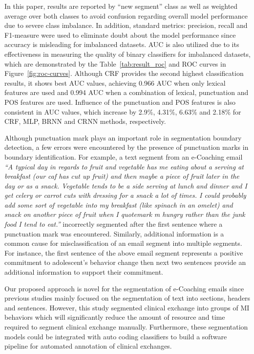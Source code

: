 \documentclass{amia}
\begin{document}
In this paper, results are reported by ``new segment'' class as well as weighted average over both classes to avoid confusion regarding overall model performance due to severe class imbalance. In addition, standard metrics: precision, recall and F1-measure were used to eliminate doubt about the model performance since accuracy is misleading for imbalanced datasets. AUC is also utilized due to its effectiveness in measuring the quality of binary classifiers for imbalanced datasets,\cite{hu2015kernelized} which are demonstrated by the Table~\ref{tab:result_roc} and ROC curves in Figure~\ref{fig:roc-curves}. Although CRF provides the second highest classification results, it shows best AUC values, achieving 0.966 AUC when only lexical features are used and 0.994 AUC when a combination of lexical, punctuation and POS features are used. Influence of the punctuation and POS features is also consistent in AUC values, which increase by 2.9\%, 4.31\%, 6.63\% and 2.18\% for CRF, MLP, BRNN and CRNN methods, respectively.

Although punctuation mark plays an important role in segmentation boundary detection, a few errors were encountered by the presence of punctuation marks in boundary identification. For example, a text segment from an e-Coaching email \textit{``A typical day in regards to fruit and vegetable has me eating about a serving at breakfast (our caf has cut up fruit) and then maybe a piece of fruit later in the day or as a snack. Vegetable tends to be a side serving at lunch and dinner and I get celery or carrot cuts with dressing for a snack a lot of times. I could probably add some sort of vegetable into my breakfast (like spinach in an omelet) and snack on another piece of fruit when I quotemark m hungry rather than the junk food I tend to eat.''} incorrectly segmented after the first sentence where a punctuation mark was encountered. Similarly, additional information is a common cause for misclassification of an email segment into multiple segments. For instance, the first sentence of the above email segment represents a positive commitment to adolescent's behavior change then next two sentences provide an additional information to support their commitment. 

Our proposed approach is novel for the segmentation of e-Coaching emails since previous studies mainly focused on the segmentation of text into sections, headers and sentences. However, this study segmented clinical exchange into groups of MI behaviors which will significantly reduce the amount of resource and time required to segment clinical exchange manually. Furthermore, these segmentation models could be integrated with auto coding classifiers to build a software pipeline for automated annotation of clinical exchanges.
\end{document}
